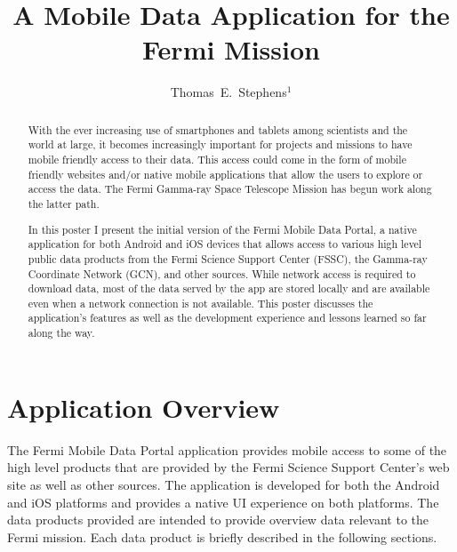 
\resetcounters


\title{A Mobile Data Application for the Fermi Mission}
\author{Thomas~E.~Stephens$^1$}


\begin{abstract}
With the ever increasing use of smartphones and tablets among scientists and the world at large, it becomes increasingly important for projects and missions to have mobile friendly access to their data. This access could come in the form of mobile friendly websites and/or native mobile applications that allow the users to explore or access the data. The Fermi Gamma-ray Space Telescope Mission has begun work along the latter path.

In this poster I present the initial version of the Fermi Mobile Data Portal, a native application for both Android and iOS devices that allows access to various high level public data products from the Fermi Science Support Center (FSSC), the Gamma-ray Coordinate Network (GCN), and other sources. While network access is required to download data, most of the data served by the app are stored locally and are available even when a network connection is not available. This poster discusses the application's features as well as the development experience and lessons learned so far along the way. 
\end{abstract}

\section{Application Overview}
The Fermi Mobile Data Portal application provides mobile access to some of the high level products  that are provided by the Fermi Science Support Center's web site as well as other sources.  The application is developed for both the Android and iOS platforms and provides a native UI experience on both platforms.  The data products provided are intended to provide overview data relevant to the Fermi mission.  Each data product is briefly described in the following sections.

